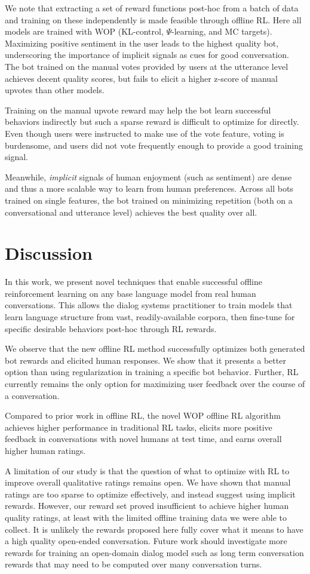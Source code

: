 We note that extracting a set of reward functions post-hoc from a batch of data and training on these independently is made feasible through offline RL. Here all models are trained with WOP (KL-control, $\Psi$-learning, and MC targets). Maximizing positive sentiment in the user leads to the highest quality bot, underscoring the importance of implicit signals as cues for good conversation. The bot trained on the manual votes provided by users at the utterance level achieves decent quality scores, but fails to elicit a higher z-score of manual upvotes than other models. 

Training on the manual upvote reward may help the bot learn successful behaviors indirectly but such a sparse reward is difficult to optimize for directly. Even though users were instructed to make use of the vote feature, voting is burdensome, and users did not vote frequently enough to provide a good training signal. 

Meanwhile, \textit{implicit} signals of human enjoyment (such as sentiment) are dense and thus a more scalable way to learn from human preferences. Across all bots trained on single features, the bot trained on minimizing repetition (both on a conversational and utterance level) achieves the best quality over all. 

\section{Discussion}
In this work, we present novel techniques that enable successful offline reinforcement learning on any base language model from real human conversations. This allows the dialog systems practitioner to train models that learn language structure from vast, readily-available corpora, then fine-tune for specific desirable behaviors post-hoc through RL rewards. 

We observe that the new offline RL method successfully optimizes both generated bot rewards and elicited human responses. We show that it presents a better option than using regularization in training a specific bot behavior. Further, RL currently remains the only option for maximizing user feedback over the course of a conversation. 

Compared to prior work in offline RL, the novel WOP offline RL algorithm achieves higher performance in traditional RL tasks, elicits more positive feedback in conversations with novel humans at test time, and earns overall higher human ratings.

A limitation of our study is that the question of what to optimize with RL to improve overall qualitative ratings remains open.  We have shown that manual ratings are too sparse to optimize effectively, and instead suggest using implicit rewards. However, our reward set proved insufficient to achieve higher human quality ratings, at least with the limited offline training data we were able to collect. It is unlikely the rewards proposed here fully cover what it means to have a high quality open-ended conversation. Future work should investigate more rewards for training an open-domain dialog model such as long term conversation rewards that may need to be computed over many conversation turns. 

